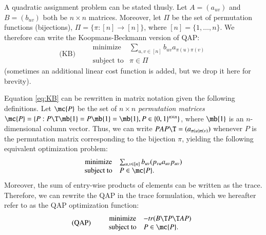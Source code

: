 \documentclass[preprint,11pt]{elsarticle}
\begin{document}

A quadratic assignment problem can be stated thusly.  Let $A=(a_{uv})$ and $B=(b_{uv})$ both be $n \times n$ matrices.   Moreover, let $\Pi$ be the set of permutation functions (bijections), $\Pi=\{\pi : [n] \to [n] \}$, where $[n]=\{1,\ldots, n\}$. We therefore can write the Koopmans-Beckmann version of QAP:
\begin{equation}
\text{(KB)} \qquad  
\begin{array}{cl}
			\text{minimize}   &\sum_{u,v \in [n]} b_{uv}a_{\pi(u)\pi(v)} \\
			\text{subject to}  &\pi \in \Pi  
\end{array}\label{eq:KB}
\end{equation}
(sometimes an additional linear cost function is added, but we drop it here for brevity).

Equation \ref{eq:KB} can be rewritten in matrix notation given the following definitions. Let $\mc{P}$ be the set of  $n \times n$ \emph{permutation matrices}  $\mc{P}=\{P : P\T \mb{1} = P \mb{1} = \mb{1}, P \in \{0,1\}^{n \times n}\}$, where $\mb{1}$ is an $n$-dimensional column vector. Thus, we can write $PAP\T=(a_{\pi(u)\pi(v)})$ whenever $P$ is the permutation matrix corresponding to the bijection $\pi$, yielding the following equivalent optimization problem:
\begin{equation*}
\begin{array}{cl}
			\text{minimize}   &\sum_{u,v \in [n]} b_{uv} (p_{vu} a_{uv} p_{uv}) \\
			\text{subject to}  &P \in \mc{P}.   
\end{array}\label{eq:QAP}
\end{equation*}
Moreover, the sum of entry-wise products of elements can be written as the trace.  Therefore, we can rewrite the QAP in the trace formulation, which we hereafter refer to as the QAP optimization function:
\begin{equation}
\text{(QAP)} \qquad  
\begin{array}{cl}
			\text{minimize}   & -tr(B\T P\T A P) \\
			\text{subject to}  &P \in \mc{P}.   
\end{array}\label{eq:QAP}
\end{equation}
\end{document}
